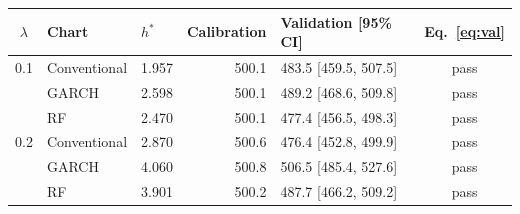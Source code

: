 \begin{tabular}{cllrlc}
\toprule
$\lambda$ & Chart & $h^*$ & Calibration & Validation [95\% CI] & Eq.~\eqref{eq:val} \\
\midrule
0.1 & Conventional & 1.957 & 500.1 & 483.5 [459.5, 507.5] & pass \\
 & GARCH & 2.598 & 500.1 & 489.2 [468.6, 509.8] & pass \\
 & RF & 2.470 & 500.1 & 477.4 [456.5, 498.3] & pass \\
0.2 & Conventional & 2.870 & 500.6 & 476.4 [452.8, 499.9] & pass \\
 & GARCH & 4.060 & 500.8 & 506.5 [485.4, 527.6] & pass \\
 & RF & 3.901 & 500.2 & 487.7 [466.2, 509.2] & pass \\
\bottomrule
\end{tabular}
